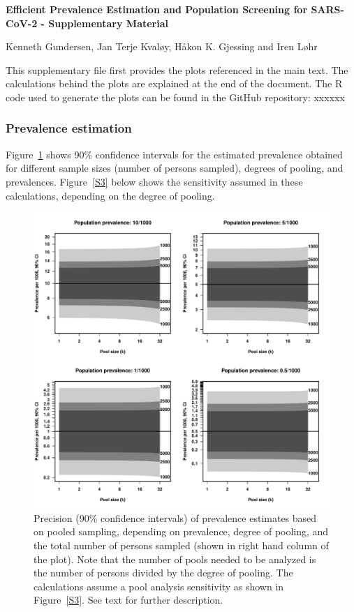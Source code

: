 \documentclass[10pt]{article}
\begin{document}
{\large \bf  Efficient Prevalence Estimation and Population Screening for SARS-CoV-2 - Supplementary Material  }                           

Kenneth Gundersen, Jan Terje Kvaløy, Håkon K. Gjessing and Iren Løhr

\vspace*{10mm}

This supplementary file first provides the plots referenced in the main text. The calculations behind the plots are explained at the end of the document. The R code used to generate the plots can be found in the GitHub repository: xxxxxx    

\subsubsection*{Prevalence estimation}

Figure~\ref{S1} shows 90\% confidence intervals for the estimated prevalence obtained for different sample sizes (number of persons sampled), degrees of pooling, and prevalences. Figure~\ref{S3} below shows the sensitivity assumed in these calculations, depending on the degree of pooling.
 
\begin{figure}[!hbt]
\begin{center}
\includegraphics[width=0.95\linewidth]{prevalences_CI.pdf}
\end{center}
\caption{Precision (90\% confidence intervals) of prevalence estimates based on pooled sampling, depending on prevalence, degree of pooling, and the total number of persons sampled (shown in right hand column of the plot). Note that the number of pools needed to be analyzed is the number of persons divided by the degree of pooling. The calculations assume a pool analysis sensitivity as shown in Figure~\ref{S3}. See text for further description.}
\label{S1}
\end{figure}
\end{document}
